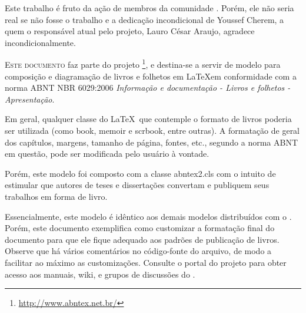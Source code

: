 \documentclass[
	10pt,				%
	openright,			%
	twoside,			%
	a5paper,			%
	english,			%
	french,				%
	spanish,			%
	brazil,				%
	sumario=tradicional
]{abntex2}
\renewcommand{\textual}{%
  \pagestyle{abntbookheadings}%
  \aliaspagestyle{chapter}{abntbookchapfirst}%
  \nouppercaseheads%
  \bookmarksetup{startatroot}%
}
\begin{document}
\begin{agradecimentos}
Este trabalho é fruto da ação de membros da comunidade \abnTeX. Porém, ele não
seria real se não fosse o trabalho e a dedicação incondicional de Youssef
Cherem, a quem o responsável atual pelo projeto, Lauro César Araujo, agradece
incondicionalmente.
\end{agradecimentos}

\listoffigures*
\cleardoublepage

\listoftables*
\cleardoublepage

\tableofcontents*
\cleardoublepage

\mainmatter


\lettrine[nindent=0.35em,lhang=0.40,loversize=0.3]{E}{ste documento} faz parte
do projeto \abnTeX\footnote{\url{http://www.abntex.net.br/}}, e destina-se
a servir de modelo para composição e diagramação de livros e folhetos em
\LaTeX em conformidade com a norma ABNT NBR 6029:2006 \emph{Informação e
documentação - Livros e folhetos - Apresentação}. 

Em geral, qualquer classe do \LaTeX\ que contemple o formato de livros poderia
ser utilizada (como \textsf{book}, \textsf{memoir} e \textsf{scrbook}, entre
outras). A formatação de geral dos capítulos, margens, tamanho de página,
fontes, etc., segundo a norma ABNT em questão, pode ser modificada pelo usuário
à vontade.

Porém, este modelo foi composto com a classe \textsf{abntex2.cls} com o intuito
de estimular que autores de teses e dissertações convertam e publiquem seus
trabalhos em forma de livro. 

Essencialmente, este modelo é idêntico aos demais modelos distribuídos com o
\abnTeX. Porém, este documento exemplifica como customizar a formatação final do
documento para que ele fique adequado aos padrões de publicação de livros.
Observe que há vários comentários no código-fonte do arquivo, de modo a
facilitar ao máximo as customizações. Consulte o portal do projeto para obter
acesso aos manuais, wiki, e grupos de discussões do \abnTeX.
\end{document}
